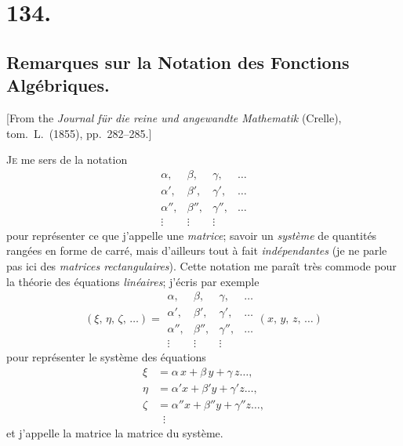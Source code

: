 \documentclass[11pt,a4paper]{article}
\theoremstyle{definition}
\begin{document}
\section*{134.}
\subsection*{Remarques sur la Notation des Fonctions Alg\'ebriques.}

[From the \textit{Journal f\"ur die reine und angewandte Mathematik} (Crelle),
tom.\ L.\ (1855), pp.\ 282--285.]

\medskip

\textsc{Je} me sers de la notation
\[
\begin{array}{cccc}
\alpha, & \beta, & \gamma, & \ldots \\
\alpha', & \beta', & \gamma', & \ldots \\
\alpha'', & \beta'', & \gamma'', & \ldots \\
\vdots & \vdots & \vdots &
\end{array}
\]
pour repr\'esenter ce que j'appelle une \textit{matrice}; savoir un
\textit{syst\`eme} de quantit\'es rang\'ees en forme de carr\'e, mais
d'ailleurs tout \`a fait \textit{ind\'ependantes} (je ne parle pas ici des
\textit{matrices rectangulaires}). Cette notation me para\^it tr\`es commode
pour la th\'eorie des \'equations \textit{lin\'eaires}; j'\'ecris par exemple
\[
(\xi,\, \eta,\, \zeta,\, \ldots) =
\begin{array}{|cccc|}
\alpha, & \beta, & \gamma, & \ldots \\
\alpha', & \beta', & \gamma', & \ldots \\
\alpha'', & \beta'', & \gamma'', & \ldots \\
\vdots & \vdots & \vdots &
\end{array}
(x,\, y,\, z,\, \ldots)
\]
pour repr\'esenter le syst\`eme des \'equations
\begin{align*}
\xi &= \alpha\,x + \beta\,y + \gamma\,z\ldots, \\
\eta &= \alpha' x + \beta' y + \gamma' z\ldots, \\
\zeta &= \alpha'' x + \beta'' y + \gamma'' z\ldots, \\
& \;\;\vdots
\end{align*}
et j'appelle la matrice la matrice du syst\`eme.

\medskip
\end{document}
